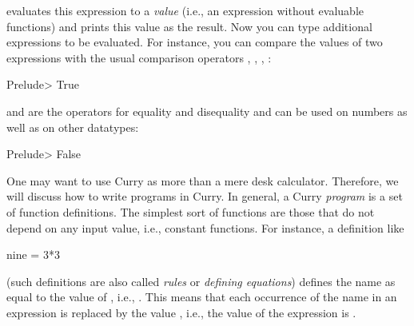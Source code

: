 evaluates this expression to a \emph{value}
(i.e., an expression without evaluable functions)
and prints this value as the result. %
Now you can type additional expressions to be evaluated. For instance,
you can compare the values of two expressions with the
usual comparison operators \code{>}, \code{<}, \code{<=}, \code{>=}:
\begin{prog}
Prelude> 
True
\end{prog}
\code{==} and \code{/=} are the operators for equality and disequality
and can be used on numbers as well as on other datatypes:
\begin{prog}
Prelude> 
False
\end{prog}
% 
One may want to use Curry as more than a mere desk calculator. Therefore, we will discuss how to write programs in Curry.
In general, a Curry \emph{program}
is a set of function definitions.
The simplest sort of functions are those that do not depend
on any input value, i.e., constant functions.
For instance, a definition like
\begin{curry}
nine = 3*3
\end{curry}
(such definitions are also called \emph{rules}
or \emph{defining equations})
defines the name  as equal to the value of ,
i.e., . This means that each occurrence of the name 
in an expression is replaced by the value , i.e., the value
of the expression  is .

